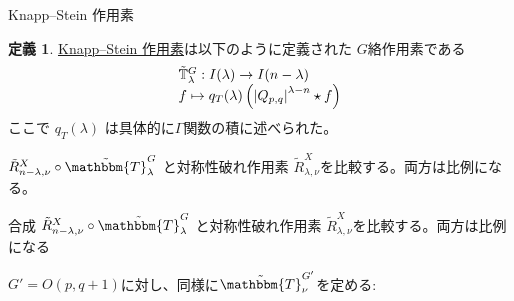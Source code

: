 \documentclass[notes,notheorems]{beamer}
\theoremstyle{definition}
\newtheorem{definition}{{定義}}
\theoremstyle{example}
\theoremstyle{remark}
\theoremstyle{mystyle}
\begin{document}
\begin{frame}{Knapp--Stein 作用素}
	\begin{definition}
		\underline{Knapp--Stein 作用素}は以下のように定義された $G$絡作用素である\begin{equation*}
			\begin{array}[]{l}
				\tilde{\mathbb{T}}_\lambda^G:I(\lambda)\to I(n-\lambda)\\
				f\mapsto q_T(\lambda)\left(\myabs{Q_{p,q}}^{\lambda-n}\star f  \right)
			\end{array}
		\end{equation*}
		ここで
		$q_T (\lambda)$ は具体的に$\Gamma$関数の積に述べられた。
	\end{definition}
		$\tilde{R}_{n - \lambda, \nu}^X \circ\tilde{\mathbbm{T}}_{\lambda}^G$ と対称性破れ作用素 $\tilde{R}_{\lambda, \nu}^X$を比較する。両方は比例になる。　
\end{frame}
\begin{frame}{}
	合成
		$\tilde{R}_{n - \lambda, \nu}^X \circ\tilde{\mathbbm{T}}_{\lambda}^G$ と対称性破れ作用素 $\tilde{R}_{\lambda, \nu}^X$を比較する。両方は比例になる
		\centerline{}
		$G' = O (p, q + 1)$に対し、同様に$\tilde{\mathbbm{T}}_{\nu}^{G'}$を定める:
		\centerline{
			}
\end{frame}
\end{document}

